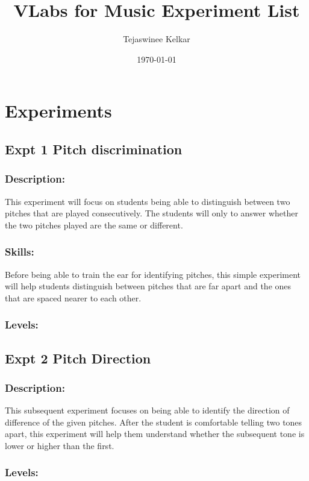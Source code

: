 \documentclass[11pt]{article}
\title{VLabs for Music Experiment List}
\author{Tejaswinee Kelkar}
\date{\today}
\begin{document}
\maketitle

\setcounter{tocdepth}{3}
\tableofcontents
\vspace*{1cm}

\section{Experiments}
\label{sec-1}
\subsection{Expt 1 Pitch discrimination}
\label{sec-1-1}
\subsubsection{Description:}
\label{sec-1-1-1}

This experiment will focus on students being able to distinguish
between two pitches that are played consecutively. The students will
only to answer whether the two pitches played are the same or
different.
\subsubsection{Skills:}
\label{sec-1-1-2}

Before being able to train the ear for identifying pitches, this
simple experiment will help students distinguish between pitches that
are far apart and the ones that are spaced nearer to each other.
\subsubsection{Levels:}
\label{sec-1-1-3}
\subsection{Expt 2 Pitch Direction}
\label{sec-1-2}
\subsubsection{Description:}
\label{sec-1-2-1}

This subsequent experiment focuses on being able to identify the
direction of difference of the given pitches. After the student is
comfortable telling two tones apart, this experiment will help them
understand whether the subsequent tone is lower or higher than the
first.
\subsubsection{Levels:}
\label{sec-1-2-2}
\end{document}
